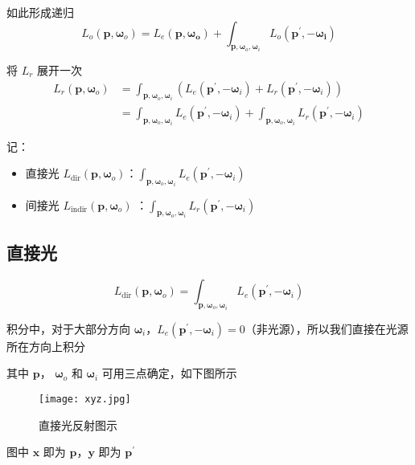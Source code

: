 \documentclass[14pt]{scrartcl} %
\begin{document}
如此形成递归
\begin{equation}
L_o(\pmb{p},\pmb{\omega}_o)=L_e(\pmb{p},\pmb{\pmb{\omega}_o})+\int_{\pmb{p},\pmb{\omega}_o,\pmb{\omega}_i}L_o(\pmb{p}^\prime,-\pmb{\omega_i})
\end{equation}

将 $L_r$ 展开一次
\begin{equation}
\begin{aligned}
L_r(\pmb{p},\pmb{\omega}_o)
&=\int_{\pmb{p},\pmb{\omega}_o,\pmb{\omega}_i}\left(L_e(\pmb{p}^\prime,-\pmb{\omega}_i)+L_r(\pmb{p}^\prime,-\pmb{\omega}_i)\right)\\
&=\int_{\pmb{p},\pmb{\omega}_o,\pmb{\omega}_i}L_e(\pmb{p}^\prime,-\pmb{\omega}_i)
+\int_{\pmb{p},\pmb{\omega}_o,\pmb{\omega}_i}L_r(\pmb{p}^\prime,-\pmb{\omega}_i)
\end{aligned}
\end{equation}

记：
\begin{itemize}
	\item 直接光  $L_{\text{dir}}(\pmb{p},\pmb{\omega}_o)$：$\int_{\pmb{p},\pmb{\omega}_o,\pmb{\omega}_i}L_e(\pmb{p}^\prime,-\pmb{\omega}_i)$
	
	\item 间接光 $L_{\text{indir}}(\pmb{p},\pmb{\omega}_o)$  ：$\int_{\pmb{p},\pmb{\omega}_o,\pmb{\omega}_i}L_r(\pmb{p}^\prime,-\pmb{\omega}_i)$
\end{itemize}
\subsection{直接光}
\begin{equation}
L_{\text{dir}}(\pmb{p},\pmb{\omega}_o)=\int_{\pmb{p},\pmb{\omega}_o,\pmb{\omega}_i}L_e(\pmb{p}^\prime,-\pmb{\omega}_i)
\end{equation}

积分中，对于大部分方向 $\pmb{\omega}_i$，$L_e(\pmb{p}^\prime,-\pmb{\omega}_i)=0$（非光源），所以我们直接在光源所在方向上积分

其中 $\pmb{p}$， $\pmb{\omega}_o$ 和 $\pmb{\omega}_i$ 可用三点确定，如下图所示

\begin{figure}[h] %
	\centering
	\texttt{[image: xyz.jpg]} %
	\caption{直接光反射图示}
\end{figure}

图中 $\pmb{x}$ 即为 $\pmb{p}$，$\pmb{y}$ 即为 $\pmb{p}^\prime$ 
\end{document}
